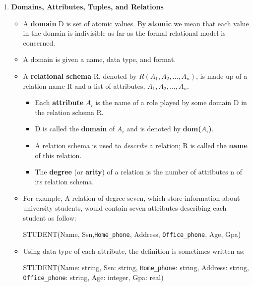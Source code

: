 \documentclass[10pt]{article}
\newcommand{\tf}{\textbf}
\newcommand{\ti}{\textit}
\newcommand{\ttt}{\texttt}
\begin{document}
\begin{enumerate}
	\item \tf{Domains, Attributes, Tuples, and Relations}
	\begin{itemize}
		\item A \tf{domain} D is set of atomic values. By \tf{atomic} we mean that each value in the domain is indivisible as far as the formal relational model is concerned.
		\item A domain is given a name, data type, and format.
		\item A \tf{relational schema} R, denoted by $R(A_1, A_2, \ldots, A_n)$, is made up of a relation name R and a list of attributes, $A_1, A_2, \ldots, A_n$.
		\begin{itemize}
			\item Each \tf{attribute} $A_i$ is the name of a role played by some domain D in the relation schema R.
			\item D is called the \tf{domain} of $A_{i}$ and is denoted by \tf{dom($A_i$)}.
			\item A relation schema is used to \ti{describe} a relation; R is called the \tf{name} of this relation.
			\item The \tf{degree} (or \tf{arity}) of a relation is the number of attributes n of its relation schema.
		\end{itemize}
		\item For example, A relation of degree seven, which store information about university students, would contain seven attributes describing each student as follow: \\
		\begin{center}
		STUDENT(Name, Ssn,\ttt{Home\_phone}, Address, \ttt{Office\_phone}, Age, Gpa)
		\end{center}
		\item Using data type of each attribute, the definition is sometimes written as:
		\begin{center}
		STUDENT(Name: string, Ssn: string, \ttt{Home\_phone}: string, Address: string, \ttt{Office\_phone}: string, Age: integer, Gpa: real)
		\end{center}


\end{itemize}
\end{enumerate}
\end{document}
